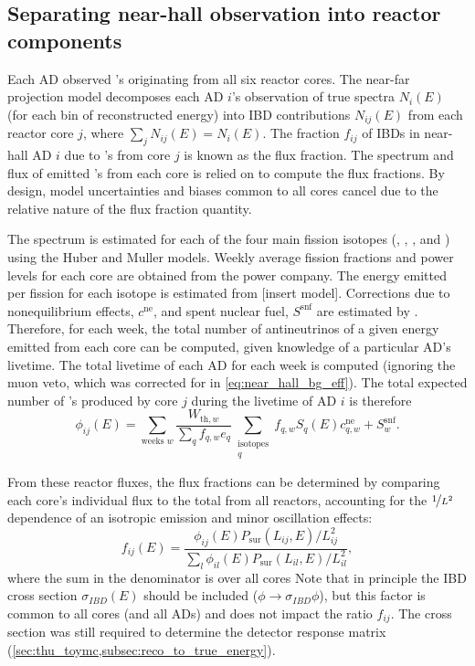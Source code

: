 \subsection{Separating near-hall observation into reactor components}
\label{subsec:flux_fraction}

Each AD observed \nuebar{}'s originating from all six reactor cores.
The near-far projection model decomposes each AD $i$'s observation
of true \nuebar{} spectra $N_i(E)$ (for each bin of reconstructed energy)
into IBD contributions $N_{ij}(E)$ from each reactor core $j$,
where $\sum_j N_{ij}(E) = N_i(E)$.
The fraction $f_{ij}$ of IBDs in near-hall AD $i$
due to \nuebar{}'s from core $j$ is known as the flux fraction.
The spectrum and flux of emitted \nuebar{}'s from each core is relied on
to compute the flux fractions.
By design, model uncertainties and biases common to all cores cancel
due to the relative nature of the flux fraction quantity.

The \nuebar{} spectrum is estimated for each of the four main fission isotopes
(, , , and )
using the Huber and Muller models.
Weekly average fission fractions and power levels for each core
are obtained from the power company.
The energy emitted per fission for each isotope is estimated from
[insert model].
Corrections due to nonequilibrium effects, $c^{\text{ne}}$,
and spent nuclear fuel, $S^{\text{snf}}$
are estimated by .
Therefore, for each week, the total number of antineutrinos
of a given energy emitted from each core can be computed,
given knowledge of a particular AD's livetime.
The total livetime of each AD for each week is computed
(ignoring the muon veto, which was corrected for in
\cref{eq:near_hall_bg_eff}).
The total expected number of \nuebar{}'s produced by core $j$
during the livetime of AD $i$ is therefore
\begin{equation}
    \phi_{ij}(E) = \sum_{\text{weeks }w}
        \frac{W_{\text{th},w}}{\sum_q f_{q,w} e_q}
        \sum_{\substack{\text{isotopes}\\q}}
        f_{q,w} S_q(E) c_{q,w}^{\text{ne}} + S_w^{\text{snf}}.
\end{equation}

From these reactor fluxes, the flux fractions can be determined
by comparing each core's individual flux to the total from all reactors,
accounting for the $\nicefrac{1}{L^2}$ dependence of an isotropic emission
and minor oscillation effects:
\begin{equation}\label{eq:flux_fraction}
    f_{ij}(E) = \frac{\phi_{ij}(E)P_\text{sur}(L_{ij}, E)/L_{ij}^2}{
        \sum_l \phi_{il}(E)P_\text{sur}(L_{il}, E)/L_{il}^2
    },
\end{equation}
where the sum in the denominator is over all cores
Note that in principle the IBD cross section $\sigma_{IBD}(E)$
should be included ($\phi \to \sigma_{IBD}\phi$),
but this factor is common to all cores (and all ADs)
and does not impact the ratio $f_{ij}$.
The cross section was still required to determine the detector response matrix
(\cref{sec:thu_toymc,subsec:reco_to_true_energy}).

